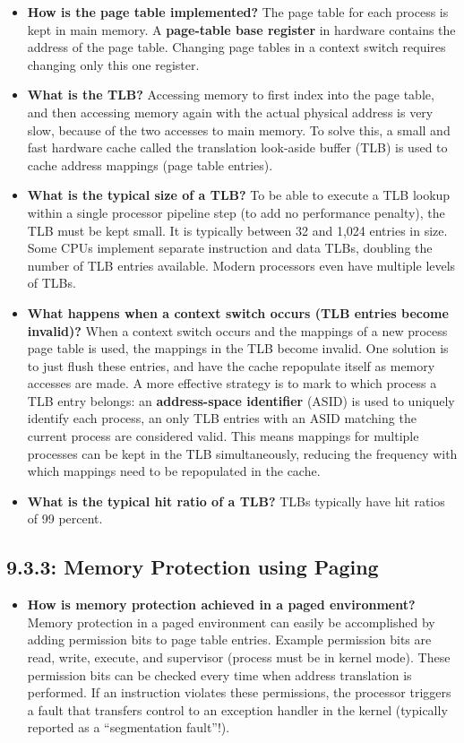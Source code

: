 \documentclass[12pt]{article}
\begin{document}
\begin{itemize}
    \item \textbf{How is the page table implemented?} The page table for each process is kept in main memory. A \textbf{page-table base register} in hardware contains the address of the page table. Changing page tables in a context switch requires changing only this one register.
    \item \textbf{What is the TLB?} Accessing memory to first index into the page table, and then accessing memory again with the actual physical address is very slow, because of the two accesses to main memory. To solve this, a small and fast hardware cache called the translation look-aside buffer (TLB) is used to cache address mappings (page table entries).
    \item \textbf{What is the typical size of a TLB?} To be able to execute a TLB lookup within a single processor pipeline step (to add no performance penalty), the TLB must be kept small. It is typically between 32 and 1,024 entries in size. Some CPUs implement separate instruction and data TLBs, doubling the number of TLB entries available. Modern processors even have multiple levels of TLBs.
    \item \textbf{What happens when a context switch occurs (TLB entries become invalid)?} When a context switch occurs and the mappings of a new process page table is used, the mappings in the TLB become invalid. One solution is to just flush these entries, and have the cache repopulate itself as memory accesses are made. A more effective strategy is to mark to which process a TLB entry belongs: an \textbf{address-space identifier} (ASID) is used to uniquely identify each process, an only TLB entries with an ASID matching the current process are considered valid. This means mappings for multiple processes can be kept in the TLB simultaneously, reducing the frequency with which mappings need to be repopulated in the cache.
    \item \textbf{What is the typical hit ratio of a TLB?} TLBs typically have hit ratios of 99 percent.
\end{itemize}

\subsection*{9.3.3: Memory Protection using Paging}

\begin{itemize}
    \item \textbf{How is memory protection achieved in a paged environment?} Memory protection in a paged environment can easily be accomplished by adding permission bits to page table entries. Example permission bits are read, write, execute, and supervisor (process must be in kernel mode). These permission bits can be checked every time when address translation is performed. If an instruction violates these permissions, the processor triggers a fault that transfers control to an exception handler in the kernel (typically reported as a ``segmentation fault''!).
\end{itemize}
\end{document}
